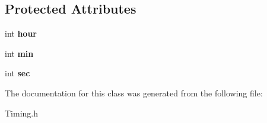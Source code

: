 \subsection*{Protected Attributes}
\begin{DoxyCompactItemize}
\item 
\hypertarget{class_time_a497d35aa44ea40706dbab08f7a31d069}{int {\bfseries hour}}\label{class_time_a497d35aa44ea40706dbab08f7a31d069}

\item 
\hypertarget{class_time_aa76ccbe1c5b4f22472247fd517b1a903}{int {\bfseries min}}\label{class_time_aa76ccbe1c5b4f22472247fd517b1a903}

\item 
\hypertarget{class_time_a348691e37ae949e13b2c19f8db461c0e}{int {\bfseries sec}}\label{class_time_a348691e37ae949e13b2c19f8db461c0e}

\end{DoxyCompactItemize}


The documentation for this class was generated from the following file\+:\begin{DoxyCompactItemize}
\item 
Timing.\+h\end{DoxyCompactItemize}
